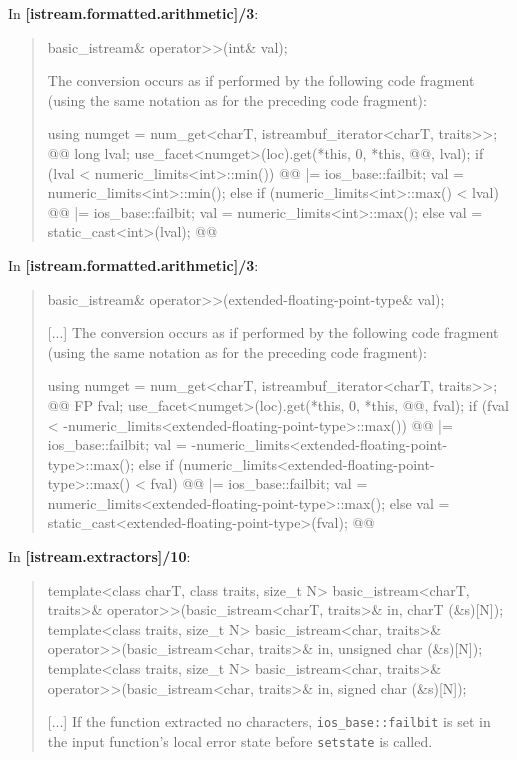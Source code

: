 \documentclass{wg21}
\begin{document}
In \textbf{[istream.formatted.arithmetic]/3}:
\begin{quote}
\begin{codeblock}
basic_istream& operator>>(int& val);
\end{codeblock}
The conversion occurs as if performed by the following code fragment (using the
same notation as for the preceding code fragment):
\begin{codeblock}
  using numget = num_get<charT, istreambuf_iterator<charT, traits>>;
  @@
  long lval;
  use_facet<numget>(loc).get(*this, 0, *this, @@, lval);
  if (lval < numeric_limits<int>::min()) {
    @@ |= ios_base::failbit;
    val = numeric_limits<int>::min();
  } else if (numeric_limits<int>::max() < lval) {
    @@ |= ios_base::failbit;
    val = numeric_limits<int>::max();
  }  else
    val = static_cast<int>(lval);
  @@
\end{codeblock}
\end{quote}

In \textbf{[istream.formatted.arithmetic]/3}:
\begin{quote}
\begin{codeblock}
basic_istream& operator>>(extended-floating-point-type& val);
\end{codeblock}
[...]
The conversion occurs as if performed by the following code fragment (using the
same notation as for the preceding code fragment):
\begin{codeblock}
  using numget = num_get<charT, istreambuf_iterator<charT, traits>>;
  @@
  FP fval;
  use_facet<numget>(loc).get(*this, 0, *this, @@, fval);
  if (fval < -numeric_limits<extended-floating-point-type>::max()) {
    @@ |= ios_base::failbit;
    val = -numeric_limits<extended-floating-point-type>::max();
  } else if (numeric_limits<extended-floating-point-type>::max() < fval) {
    @@ |= ios_base::failbit;
    val = numeric_limits<extended-floating-point-type>::max();
  } else {
    val = static_cast<extended-floating-point-type>(fval);
  }
  @@
\end{codeblock}
\end{quote}

In \textbf{[istream.extractors]/10}:
\begin{quote}
\begin{codeblock}
template<class charT, class traits, size_t N>
  basic_istream<charT, traits>& operator>>(basic_istream<charT, traits>& in, charT (&s)[N]);
template<class traits, size_t N>
  basic_istream<char, traits>& operator>>(basic_istream<char, traits>& in, unsigned char (&s)[N]);
template<class traits, size_t N>
  basic_istream<char, traits>& operator>>(basic_istream<char, traits>& in, signed char (&s)[N]);
\end{codeblock}
[...]
If the function extracted no characters, 
{\texttt{ios_base::failbit} is set in the input function's local error state
before \texttt{setstate} is called}.
\end{quote}
\end{document}
